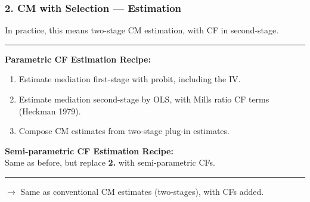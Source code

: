 \documentclass[dvipsnames]{beamer} %
\begin{document}
\begin{frame}
    \frametitle{2. CM with Selection --- Estimation}
    In practice, this means two-stage CM estimation, with CF in second-stage.

    \par\noindent\rule{\textwidth}{0.4pt}
    \textbf{Parametric CF Estimation Recipe:}
    \begin{enumerate}
        \item Estimate mediation first-stage with probit, including the IV.
        \item Estimate mediation second-stage by OLS, with Mills ratio CF terms (Heckman 1979).
        \item Compose CM estimates from two-stage plug-in estimates.
    \end{enumerate}

    \vskip0.5cm
    \textcolor{gray!25}{
    \textbf{Semi-parametric CF Estimation Recipe:} \\
    Same as before, but replace \textbf{2.} with semi-parametric CFs.}

    \vfill

    \par\noindent\rule{\textwidth}{0.4pt}
    $\to$ Same as conventional CM estimates (two-stages), with CFs added.
\end{frame}
\end{document}

